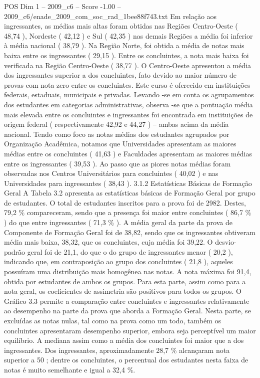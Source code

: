 \begin{textsample}{POS Dim 1 – 2009\_c6 – Score -1.00 – 2009\_c6/enade\_2009\_com\_soc\_rad\_1bee88f743.txt}
Em relação aos ingressantes, as médias mais altas foram obtidas nas Regiões Centro-Oeste ( 48,74 ), Nordeste ( 42,12 ) e Sul ( 42,35 ) nas demais Regiões a média foi inferior à média nacional ( 38,79 ).
Na Região Norte, foi obtida a média de notas mais baixa entre os ingressantes ( 29,15 ).
Entre os concluintes, a nota mais baixa foi verificada na Região Centro-Oeste ( 38,77 ).
O Centro-Oeste apresentou a média dos ingressantes superior a dos concluintes, fato devido ao maior número de provas com nota zero entre os concluintes.
Este curso é oferecido em instituições federais, estaduais, municipais e privadas.
Levando -se em conta os agrupamentos dos estudantes em categorias administrativas, observa -se que a pontuação média mais elevada entre os concluintes e ingressantes foi encontrada em instituições de origem federal ( respectivamente 42,92 e 44,27 ) – ambas acima da média nacional.
Tendo como foco as notas médias dos estudantes agrupados por Organização Acadêmica, notamos que Universidades apresentam as maiores médias entre os concluintes ( 41,63 ) e Faculdades apresentam as maiores médias entre os ingressantes ( 39,53 ).
Ao passo que as piores notas médias foram observadas nos Centros Universitários para concluintes ( 40,02 ) e nas Universidades para ingressantes ( 38,43 ). 3.1.2 Estatísticas Básicas de Formação Geral A Tabela 3.2 apresenta as estatísticas básicas de Formação Geral por grupo de estudantes.
O total de estudantes inscritos para a prova foi de 2982.
Destes, 79,2 \% compareceram, sendo que a presença foi maior entre concluintes ( 86,7 \% ) do que entre ingressantes ( 71,3 \% ).
A média geral da parte da prova de Componente de Formação Geral foi de 38,82, sendo que os ingressantes obtiveram média mais baixa, 38,32, que os concluintes, cuja média foi 39,22.
O desvio-padrão geral foi de 21,1, do que o do grupo de ingressantes menor ( 20,2 ), indicando que, em contraposição ao grupo dos concluintes ( 21,8 ), aqueles possuíram uma distribuição mais homogênea nas notas.
A nota máxima foi 91,4, obtida por estudantes de ambos os grupos.
Para esta parte, assim como para a nota geral, os coeficientes de assimetria são positivos para todos os grupos.
O Gráfico 3.3 permite a comparação entre concluintes e ingressantes relativamente ao desempenho na parte da prova que aborda a Formação Geral.
Nesta parte, se excluídas as notas nulas, tal como na prova como um todo, também os concluintes apresentaram desempenho superior, embora seja perceptível um maior equilíbrio.
A mediana assim como a média dos concluintes foi maior que a dos ingressantes.
Dos ingressantes, aproximadamente 28,7 \% alcançaram nota superior a 50 ; dentre os concluintes, o percentual dos estudantes nesta faixa de notas é muito semelhante e igual a 32,4 \%.

\end{textsample}
